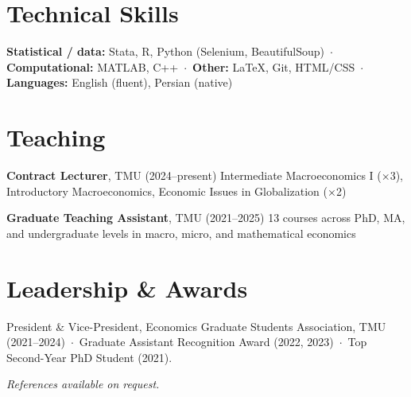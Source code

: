 \documentclass[10pt]{article}
\begin{document}
\section{Technical Skills}

\noindent\textbf{Statistical / data:} Stata, R, Python (Selenium, BeautifulSoup) \,$\cdot$\,
\textbf{Computational:} MATLAB, C++ \,$\cdot$\,
\textbf{Other:} \LaTeX{}, Git, HTML/CSS \,$\cdot$\,
\textbf{Languages:} English (fluent), Persian (native)

\section{Teaching}

\noindent\textbf{Contract Lecturer}, TMU (2024--present) \hfill
Intermediate Macroeconomics I (×3), Introductory Macroeconomics, Economic Issues in Globalization (×2)

\vspace{4pt}
\noindent\textbf{Graduate Teaching Assistant}, TMU (2021--2025) \hfill
13 courses across PhD, MA, and undergraduate levels in macro, micro, and mathematical economics

\section{Leadership \& Awards}
\noindent President \& Vice-President, Economics Graduate Students Association, TMU (2021--2024) \,$\cdot$\,
Graduate Assistant Recognition Award (2022, 2023) \,$\cdot$\,
Top Second-Year PhD Student (2021).

\vspace{6pt}
\begin{center}\small\textit{References available on request.}\end{center}
\end{document}
